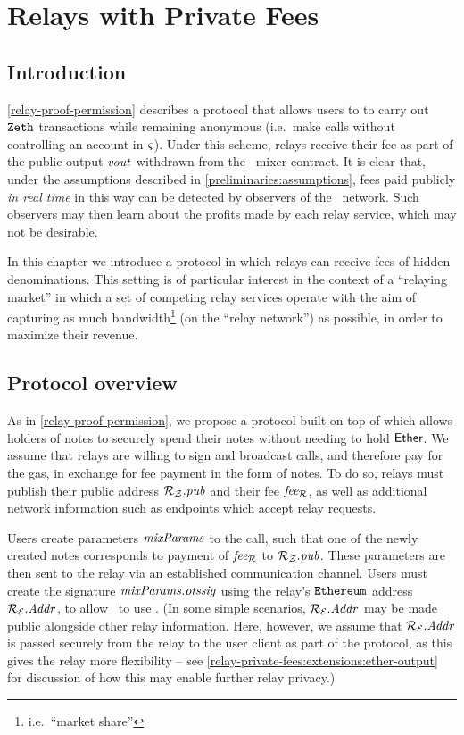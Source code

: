 
\chapter{Relays with Private Fees}\label{relay-private-fees}

\section{Introduction}

\cref{relay-proof-permission} describes a protocol that allows users to to carry out $\texttt{Zeth}$ transactions while remaining anonymous (i.e.~make \mix{} calls without controlling an \ethereum{} account in $\mathit{\varsigma}$). Under this scheme, relays receive their fee as part of the public output $\mathit{vout}$ withdrawn from the \zeth~mixer contract. It is clear that, under the assumptions described in \cref{preliminaries:assumptions}, fees paid publicly \emph{in real time} in this way can be detected by observers of the \ethereum~network. Such observers may then learn about the profits made by each relay service, which may not be desirable.

In this chapter we introduce a protocol in which relays can receive fees of hidden denominations. This setting is of particular interest in the context of a ``relaying market'' in which a set of competing relay services operate with the aim of capturing as much bandwidth\footnote{i.e.~``market share''} (on the ``relay network'') as possible, in order to maximize their revenue.

\section{Protocol overview}\label{relay-private-fees:protocol-overview}

As in \cref{relay-proof-permission}, we propose a protocol built on top of \zeth{} which allows holders of \zeth{} notes to securely spend their notes without needing to hold $\mathsf{Ether}$. We assume that relays are willing to sign and broadcast \mix{} calls, and therefore pay for the gas, in exchange for fee payment in the form of \zeth{} notes. To do so, relays must publish their public \zeth{} address $\mathcal{{R}_{Z}}.\mathit{pub}$ and their fee $\mathit{fee_{\mathcal{R}}}$, as well as additional network information such as endpoints which accept relay requests.

Users create parameters $\mathit{mixParams}$ to the \mix{} call, such that one of the newly created notes corresponds to payment of $\mathit{fee_{\mathcal{R}}}$ to $\mathcal{{R}_{Z}}.\mathit{pub}$. These parameters are then sent to the relay via an established communication channel. Users must create the signature $\mathit{mixParams}.\mathit{otssig}$ using the relay's $\texttt{Ethereum}$ address $\mathcal{{R}_{E}}.\mathit{Addr}$, to allow \relayEthAccount~to use \mixparams{}.
(In some simple scenarios, $\mathcal{{R}_{E}}.\mathit{Addr}$ may be made public alongside other relay information. Here, however, we assume that $\mathcal{{R}_{E}}.\mathit{Addr}$ is passed securely from the relay to the user client as part of the protocol, as this gives the relay more flexibility -- see \cref{relay-private-fees:extensions:ether-output} for discussion of how this may enable further relay privacy.)

